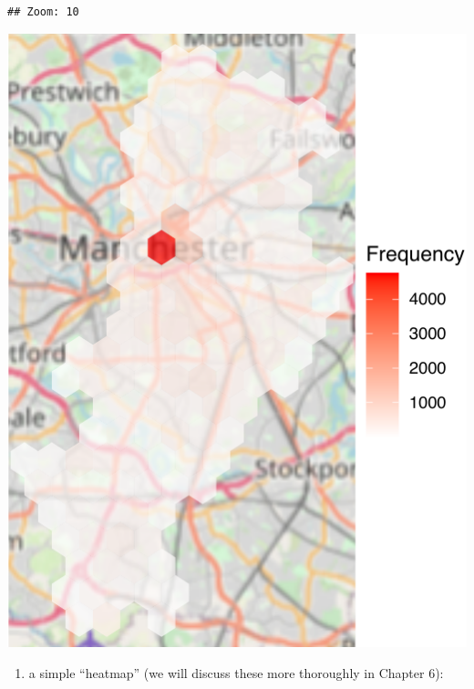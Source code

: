\documentclass[
]{book}
\providecommand{\tightlist}{%
  \setlength{\itemsep}{0pt}\setlength{\parskip}{0pt}}
\begin{document}
\begin{verbatim}
## Zoom: 10
\end{verbatim}

\includegraphics{crime_mapping_files/figure-latex/unnamed-chunk-129-1.pdf}

\begin{enumerate}
\def\labelenumi{\alph{enumi})}
\setcounter{enumi}{2}
\tightlist
\item
  a simple ``heatmap'' (we will discuss these more thoroughly in Chapter 6):
\end{enumerate}
\end{document}
